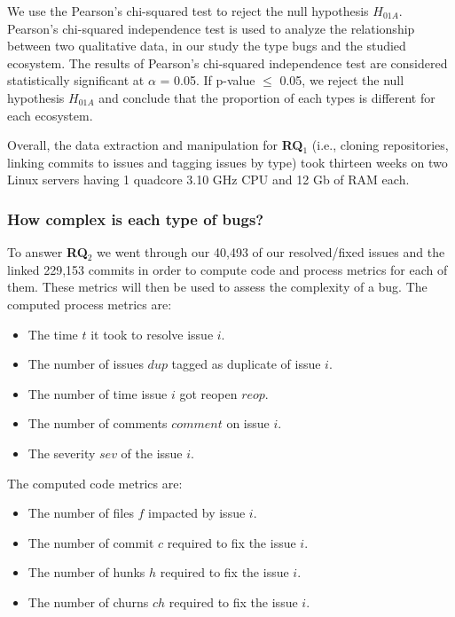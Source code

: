 We use the Pearson's chi-squared test to reject the null hypothesis $H_{01A}$.
Pearson's chi-squared independence test is used to analyze the relationship between two qualitative data, in our study the type bugs and the studied ecosystem.
The results of Pearson's chi-squared independence test are considered
statistically significant at $\alpha$ = 0.05.
If p-value $\le$ 0.05, we reject the null hypothesis $H_{01A}$ and conclude that the proportion of each types is different for each ecosystem.

Overall, the data extraction and manipulation for {\bf RQ$_1$} (i.e., cloning repositories, linking commits to issues and tagging issues by type) took thirteen weeks on two Linux servers having 1 quadcore
3.10 GHz CPU and 12 Gb of RAM each.

\subsubsection{How complex is each type of bugs?}  To answer {\bf RQ$_2$} we went through our 40,493 of our resolved/fixed issues and the linked 229,153 commits in order to compute code and process metrics for each of them.
These metrics will then be used to assess the complexity of a bug.
The computed process metrics are:

\begin{itemize}
  \item The time $t$ it took to resolve issue $i$.
  \item The number of issues $dup$ tagged as duplicate of issue $i$.
  \item The number of time issue $i$ got reopen $reop$.
  \item The number of comments $comment$ on issue $i$.
  \item The severity $sev$ of the issue $i$.
\end{itemize}

The computed code metrics are:

\begin{itemize}
  \item The number of files $f$ impacted by issue $i$.
  \item The number of commit $c$ required to fix the issue $i$.
  \item The number of hunks $h$ required to fix the issue $i$.
  \item The number of churns $ch$ required to fix the issue $i$.
\end{itemize}



